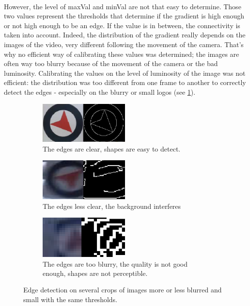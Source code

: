 \documentclass[12pt]{article}%
\begin{document}
\paragraph{}
However, the level of maxVal and minVal are not that easy to determine.  Those two values represent the thresholds that determine if the gradient is high enough or not high enough to be an edge. If the value is in between, the connectivity is taken into account. Indeed, the distribution of the gradient really depends on the images of the video, very different following the movement of the camera. That's why no efficient way of calibrating these values was determined; the images are often way too blurry because of the movement of the camera or the bad luminosity. Calibrating the values on the level of luminosity of the image was not efficient: the distribution was too different from one frame to another to correctly detect the edges - especially on the blurry or small logos (see \ref{fig:edgeDetection}).

\captionsetup[subfigure]{labelformat=simple, labelsep=period}
\begin{figure}
	\centering
	\begin{subfigure}[t]{5cm}
		\centering
		\includegraphics[width=4.5cm]{images/edgeDetect1.png}
		\caption{The edges are clear, shapes are easy to detect.}
	\end{subfigure}
	\begin{subfigure}[t]{5cm}
		\centering
		\includegraphics[width=4.5cm]{images/edgeDetect2.png}
		\caption{The edges less clear, the background interferes}
	\end{subfigure}
	\begin{subfigure}[t]{5cm}
		\centering
		\includegraphics[width=4.5cm]{images/edgeDetect3.png}
		\caption{The edges are too blurry, the quality is not good enough, shapes are not perceptible.}
	\end{subfigure}
	\caption{Edge detection on several crops of images more or less blurred and small with the same thresholds.}\label{fig:edgeDetection}
\end{figure}
\end{document}
